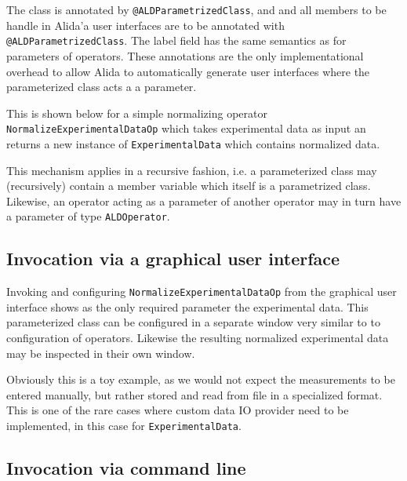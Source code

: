 The class is annotated by \lstinline+@ALDParametrizedClass+, and
and all members to be handle in Alida'a user interfaces are
to be annotated with \lstinline+@ALDParametrizedClass+.
The label field has the same semantics as for parameters of operators.
These annotations are the only implementational overhead
to allow Alida to automatically generate user interfaces
where the parameterized class acts a a parameter.

\renewcommand{\codefile}{../../../../../../src/de/unihalle/informatik/Alida/demo/ExperimentalData.java}
\setcounter{off}{53}

This is shown below for a simple normalizing operator \lstinline+NormalizeExperimentalDataOp+
which takes experimental data as input an returns a new instance
of \lstinline+ExperimentalData+ which contains normalized data.

\renewcommand{\codefile}{../../../../../../src/de/unihalle/informatik/Alida/demo/NormalizeExperimentalDataOp.java}
\setcounter{off}{50}


This mechanism applies in a recursive fashion, i.e. a parameterized class may
(recursively) contain a member variable which itself is a parametrized class.
Likewise, an operator acting as a parameter of another operator
may in turn have a parameter of type \lstinline+ALDOperator+.

\subsection{  Invocation via a graphical user interface}

Invoking and configuring \lstinline+NormalizeExperimentalDataOp+ from the graphical user interface
shows as the only required parameter the experimental data.
This parameterized class can be configured in a separate  window
very similar to to configuration of operators.
Likewise the resulting normalized experimental data
may be inspected in their own window.

Obviously this is a toy example, as we would not expect the measurements to
be entered manually, but rather stored and read from file in a specialized format.
This is one of the rare cases where 
custom data IO provider need to be implemented, in this
case for \lstinline+ExperimentalData+.


\subsection{  Invocation via command line}

